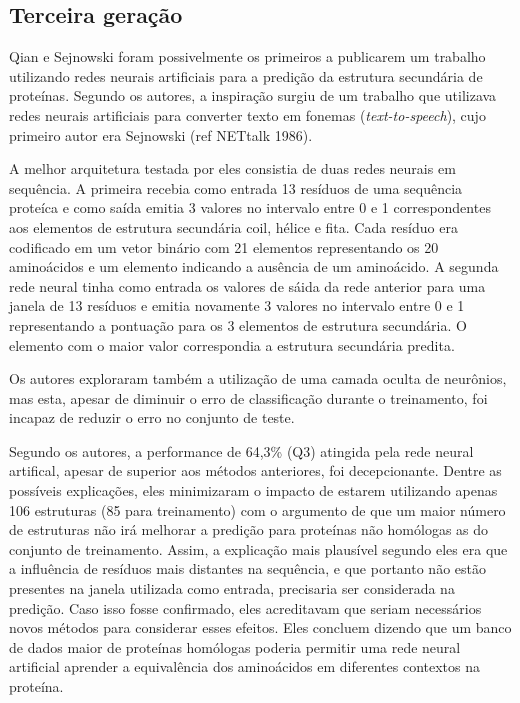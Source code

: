 \subsection{Terceira geração} 


Qian e Sejnowski \citeyear{key} foram possivelmente os primeiros a publicarem um trabalho utilizando redes neurais artificiais para a predição da estrutura secundária de proteínas. Segundo os autores, a inspiração surgiu de um trabalho que utilizava redes neurais artificiais para  converter texto em fonemas (\textit{text-to-speech}), cujo primeiro autor era Sejnowski (ref NETtalk 1986).

A melhor arquitetura testada por eles consistia de duas redes neurais em sequência. A primeira recebia como entrada 13 resíduos de uma sequência proteíca e como saída emitia 3 valores no intervalo entre 0 e 1 correspondentes aos elementos de estrutura secundária coil, hélice e fita. Cada resíduo era codificado em um vetor binário com 21 elementos representando os 20 aminoácidos e um elemento indicando a ausência de um aminoácido. A segunda rede neural tinha como entrada os valores de sáida da rede anterior para uma janela de 13 resíduos e emitia novamente 3 valores no intervalo entre 0 e 1 representando a pontuação para os 3 elementos de estrutura secundária. O elemento com o maior valor correspondia a estrutura secundária predita.

Os autores exploraram também a utilização de uma camada oculta de neurônios, mas esta, apesar de diminuir o erro de classificação durante o treinamento, foi incapaz de reduzir o erro no conjunto de teste.

Segundo os autores, a performance de 64,3\% (Q3) atingida pela rede neural artifical, apesar de superior aos métodos anteriores, foi decepcionante. Dentre as possíveis explicações, eles minimizaram o impacto de estarem utilizando apenas 106 estruturas (85 para treinamento) com o argumento de que um maior número de estruturas não irá melhorar a predição para proteínas não homólogas as do conjunto de treinamento. Assim, a explicação mais plausível segundo eles era que a influência de resíduos mais distantes na sequência, e que portanto não estão presentes na janela utilizada como entrada, precisaria ser considerada na predição. Caso isso fosse confirmado, eles acreditavam que seriam necessários novos métodos para considerar esses efeitos. Eles concluem dizendo que um banco de dados maior de proteínas homólogas poderia permitir uma rede neural artificial aprender a equivalência dos aminoácidos em diferentes contextos na proteína.

